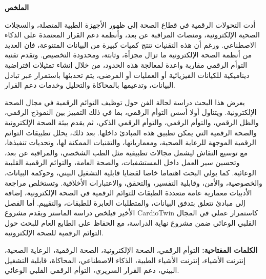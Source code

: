 \vspace*{4cm}
\begin{center}
    \begin{Arabic}
        {\Huge\bfseries الملخص}
    \end{Arabic}
\end{center}
\vskip 1cm

{}

\begin{Arabic}
أدت التحولات الرقمية في قطاع الصحة إلى ظهور الأجهزة الطبية المتصلة، والسجلات الصحية الإلكترونية،
ومنصات المراقبة عن بعد، وأنظمة دعم القرار المعتمدة على الذكاء الاصطناعي. ورغم أن هذه التقنيات
تنتج كميات كبيرة من البيانات المتنوعة، فإن العديد من أنظمة الصحة الإلكترونية ما تزال مجزأة، وثابتة،
ومحدودة التخصيص. وتقدم تقنية التوأم الرقمي مقاربة واعدة لمعالجة هذه الحدود، من خلال إنشاء
تمثيلات افتراضية ديناميكية للكيانات الفيزيائية أو العمليات أو المرضى، يتم تحديثها باستمرار عبر تبادل
البيانات، وتدعيمها بالمحاكاة والتحليل وخدمات دعم القرار.

يعرض هذا البحث دراسة لحالة الفن حول توظيف التوائم الرقمية في مجال الصحة الإلكترونية. ويتناول
أولا أسس التوأم الرقمي، بما في ذلك التمييز بين النموذج الرقمي، والظل الرقمي، والتوأم الرقمي،
والتوأم الرقمي الذكي، ثم يقدم بيئة الصحة الإلكترونية والصحة الرقمية التي يمكن تطبيق هذه المبادئ
داخلها. بعد ذلك، يحلل تطبيقات التوائم الرقمية الموجهة للرعاية الصحية، ومعمارياتها، والتقنيات الممكنة
لها، وتحديات تنفيذها، مع توسيع النقاش ليشمل مجالات تطبيقية مثل الطب الشخصي، والمراقبة عن بعد،
وتحسين سير العمل داخل المستشفيات، والصحة العامة، والتوائم الرقمية القلبية الوعائية. كما يولي البحث
اهتماما خاصا لقضايا قابلية التشغيل البيني، وحوكمة البيانات، والخصوصية، والأمن، وقابلية التفسير،
والتحقق، والاعتبارات الأخلاقية. وتستخلص مراجعة الأدبيات معمارية عامة متعددة الطبقات للتوائم الرقمية
في الصحة الإلكترونية، إضافة إلى مبادئ تتعلق بتدفق البيانات، والمتطلبات العابرة للطبقات، والتقييم.
أما الفصل الأخير فيلخص دراسة الماستر ويقدم مشروع CardioTwin كاستمرار عملي في المجال القلبي
الوعائي ضمن مشروع نهاية الدراسة، مع الحفاظ على الطابع العام للبحث حول التوائم الرقمية للصحة
الإلكترونية.

\textbf{الكلمات المفتاحية:} التوأم الرقمي، الصحة الإلكترونية، الصحة الرقمية، الرعاية الصحية،
إنترنت الأشياء، إنترنت الأشياء الطبية، الذكاء الاصطناعي، المحاكاة، قابلية التشغيل البيني، دعم القرار
السريري، التوأم الرقمي القلبي الوعائي.
\end{Arabic}

\clearpage
